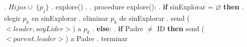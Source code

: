   \hfill{}. \hspace{1cm} $Hijos\cup \; \{p_j\}$
  \hfill{}. \hspace{1cm} explore()
  \hfill{}.
  \hfill{}. procedure explore():
  \hfill{}. \hspace{0.5cm} {\bf if} sinExplorar = $\varnothing$ {\bf then}
  \hfill{}. \hspace{1cm} elegir $p_k$ en sinExplorar
  \hfill{}. \hspace{1cm} eliminar $p_k$ de sinExplorar
  \hfill{}. \hspace{1cm} send ($<leader,soyLider>$) a $p_k$
  \hfill{}. \hspace{0.5cm} {\bf else}:
  \hfill{}. \hspace{1cm} {\bf if} Padre $\neq$ ID {\bf then} send ($<parent,leader>$) a Padre
  \hfill{}. \hspace{1.5cm} terminar
  \hfill\break
  \hfill\break
